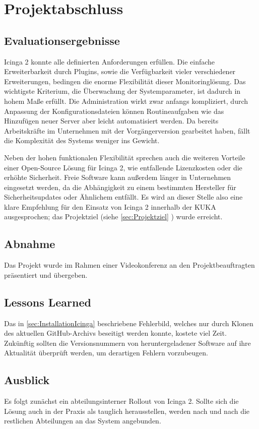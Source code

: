 \section{Projektabschluss} 
\label{sec:projektabschluss}

\subsection{Evaluationsergebnisse}
\label{sec:Evaluationsergebnisse}
\glqq{}Icinga 2\grqq{} konnte alle definierten Anforderungen erfüllen. Die einfache Erweiterbarkeit durch Plugins, sowie die Verfügbarkeit vieler verschiedener Erweiterungen, bedingen die enorme Flexibilität dieser Monitoringlösung. Das wichtigste Kriterium, die Überwachung der Systemparameter, ist dadurch in hohem Maße erfüllt. Die Administration wirkt zwar anfangs kompliziert, durch Anpassung der Konfigurationsdateien können Routineaufgaben wie das Hinzufügen neuer Server aber leicht automatisiert werden. Da bereits Arbeitskräfte im Unternehmen mit der Vorgängerversion gearbeitet haben, fällt die Komplexität des Systems weniger ins Gewicht.

Neben der hohen funktionalen Flexibilität sprechen auch die weiteren Vorteile einer Open-Source Lösung für \glqq{}Icinga 2\grqq{}, wie entfallende Lizenzkosten oder die erhöhte Sicherheit. Freie Software kann außerdem länger in Unternehmen eingesetzt werden, da die Abhängigkeit zu einem bestimmten Hersteller für Sicherheitsupdates oder Ähnlichem entfällt. Es wird an dieser Stelle also eine klare Empfehlung für den Einsatz von \glqq{}Icinga 2\grqq{} innerhalb der KUKA ausgesprochen; das Projektziel (siehe \ref{sec:Projektziel} ) wurde erreicht.

\subsection{Abnahme}
\label{sec:Abnahme}
Das Projekt wurde im Rahmen einer Videokonferenz an den Projektbeauftragten präsentiert und übergeben.

\subsection{Lessons Learned}
\label{sec:LessonsLearned}
Das in \ref{sec:InstallationIcinga}  beschriebene Fehlerbild, welches nur durch Klonen des aktuellen GitHub-Archivs beseitigt werden konnte, kostete viel Zeit. Zukünftig sollten die Versionsnummern von heruntergeladener Software auf ihre Aktualität überprüft werden, um derartigen Fehlern vorzubeugen.

\subsection{Ausblick}
\label{sec:Ausblick}
Es folgt zunächst ein abteilungsinterner Rollout von \glqq{}Icinga 2\grqq{}. Sollte sich die Lösung auch in der Praxis als tauglich herausstellen, werden nach und nach die restlichen Abteilungen an das System angebunden.